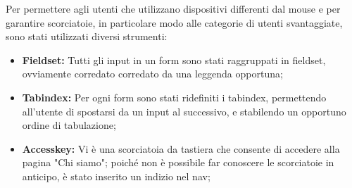 Per permettere agli utenti che utilizzano dispositivi differenti dal mouse e per garantire scorciatoie, in particolare modo alle categorie di utenti svantaggiate, sono stati utilizzati diversi strumenti:
\begin{itemize}
	\item \textbf{Fieldset:} Tutti gli input in un form sono stati raggruppati in fieldset, ovviamente corredato corredato da una leggenda opportuna;
	\item \textbf{Tabindex:} Per ogni form sono stati ridefiniti i tabindex, permettendo all'utente di spostarsi da un input al successivo, e stabilendo un opportuno ordine di tabulazione;
	\item \textbf{Accesskey: } Vi è una scorciatoia da tastiera che consente di accedere alla pagina "Chi siamo"; poiché non è possibile far conoscere le scorciatoie in anticipo, è stato inserito un indizio nel nav;
\end{itemize}